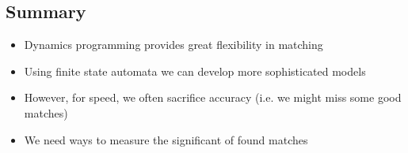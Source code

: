 
\begin{slide}
\section{Summary}

\begin{PauseHighLight}
  \begin{itemize}
  \item Dynamics programming provides great flexibility in
    matching\pause
  \item Using finite state automata we can develop more sophisticated
    models\pause
  \item However, for speed, we often sacrifice accuracy (i.e. we might
    miss some good matches)\pause
  \item We need ways to measure the significant of found matches\pause
  \end{itemize}
\end{PauseHighLight}

\end{slide}
